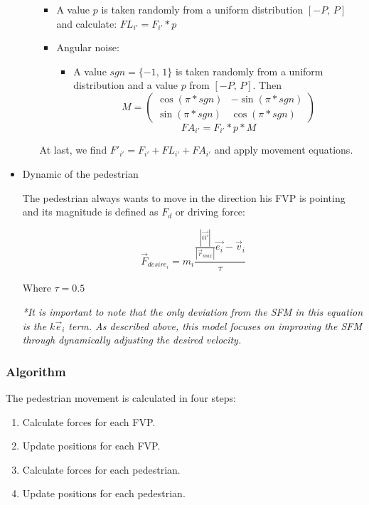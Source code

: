 \documentclass[english]{article}
\begin{document}
\begin{itemize}
\begin{itemize}
\begin{itemize}
\item A value $p$ is taken randomly from a uniform distribution $[-P,\, P]$
and calculate: $FL_{i'}=F_{i'}*p$ 
\item Angular noise: 

    \begin{itemize}
        \item A value $sgn=\{-1,\,1\}$ is taken randomly from a uniform distribution
        and a value $p$ from $[-P,\, P]$. Then \\
        \[
            M=\left(\begin{array}{cc}
            \cos(\pi*sgn) & -\sin(\pi*sgn)\\
            \sin(\pi*sgn) & \cos(\pi*sgn)
            \end{array}\right)
        \]
        \[
            FA_{i'}=F_{i'}*p*M
        \]
    \end{itemize}
\end{itemize}

At last, we find $F'_{i'}=F_{i'}+FL_{i'}+FA_{i'}$ and apply movement
equations.
\end{itemize}
\item Dynamic of the pedestrian

The pedestrian always wants to move in the direction his FVP is pointing
and its magnitude is defined as $F_{d}$ or driving force:

\[
    \vec{F}_{desire_{i}}=m_{i}\frac{\frac{|\vec{ii'}|}{|\vec{r}_{max}|}\vec{e_{i}}-\vec{v}_{i}}{\tau}
\]

Where $\tau=0.5$

\textit{{*}It is important to note that the only deviation from the
SFM in this equation is the $k\vec{e}_{i}$ term. As described above,
this model focuses on improving the SFM through dynamically adjusting
the desired velocity.}

\end{itemize}

\subsubsection{Algorithm}

The pedestrian movement is calculated in four steps: 
\begin{enumerate}
    \item Calculate forces for each FVP. 
    \item Update positions for each FVP. 
    \item Calculate forces for each pedestrian. 
    \item Update positions for each pedestrian. 
\end{enumerate}
\end{document}
